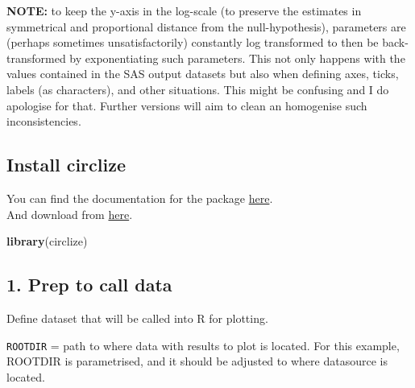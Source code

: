\documentclass[
]{article}
\newenvironment{Shaded}{\begin{snugshade}}{\end{snugshade}}
\newcommand{\KeywordTok}[1]{\textcolor[rgb]{0.13,0.29,0.53}{\textbf{#1}}}
\newcommand{\NormalTok}[1]{#1}
\newcommand{\OperatorTok}[1]{\textcolor[rgb]{0.81,0.36,0.00}{\textbf{#1}}}
\newcommand{\StringTok}[1]{\textcolor[rgb]{0.31,0.60,0.02}{#1}}
\begin{document}
\textbf{NOTE:} to keep the y-axis in the log-scale (to preserve the
estimates in symmetrical and proportional distance from the
null-hypothesis), parameters are (perhaps sometimes unsatisfactorily)
constantly log transformed to then be back-transformed by exponentiating
such parameters. This not only happens with the values contained in the
SAS output datasets but also when defining axes, ticks, labels (as
characters), and other situations. This might be confusing and I do
apologise for that. Further versions will aim to clean an homogenise
such inconsistencies.

\hypertarget{install-circlize}{%
\subsection{Install circlize}\label{install-circlize}}

You can find the documentation for the package
\href{https://jokergoo.github.io/circlize_book/book/}{here}.\\
And download from
\href{https://cran.r-project.org/src/contrib/circlize_0.4.8.tar.gz}{here}.

\begin{Shaded}
\begin{Highlighting}[]
\KeywordTok{library}\NormalTok{(circlize)}
\end{Highlighting}
\end{Shaded}

\hypertarget{prep-to-call-data}{%
\subsection{1. Prep to call data}\label{prep-to-call-data}}

Define dataset that will be called into R for plotting.

\begin{Shaded}
\end{Shaded}

\texttt{ROOTDIR} = path to where data with results to plot is located.
For this example, ROOTDIR is parametrised, and it should be adjusted to
where datasource is located.
\end{document}
